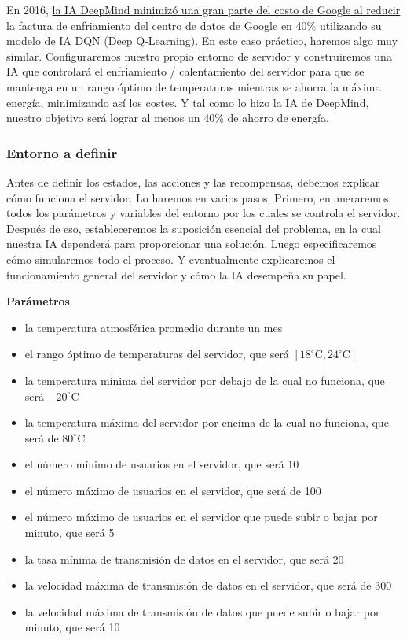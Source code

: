 \documentclass[
]{book}
\providecommand{\tightlist}{%
  \setlength{\itemsep}{0pt}\setlength{\parskip}{0pt}}
\begin{document}
En 2016, \href{https://deepmind.com/blog/deepmind-ai-reduces-google-data-centre-cooling-bill-40/}{la IA DeepMind minimizó una gran parte del costo de Google al reducir la factura de enfriamiento del centro de datos de Google en 40\%} utilizando su modelo de IA DQN (Deep Q-Learning). En este caso práctico, haremos algo muy similar. Configuraremos nuestro propio entorno de servidor y construiremos una IA que controlará el enfriamiento / calentamiento del servidor para que se mantenga en un rango óptimo de temperaturas mientras se ahorra la máxima energía, minimizando así los costes. Y tal como lo hizo la IA de DeepMind, nuestro objetivo será lograr al menos un 40\% de ahorro de energía.

\hypertarget{entorno-a-definir-1}{%
\subsubsection{Entorno a definir}\label{entorno-a-definir-1}}

Antes de definir los estados, las acciones y las recompensas, debemos explicar cómo funciona el servidor. Lo haremos en varios pasos. Primero, enumeraremos todos los parámetros y variables del entorno por los cuales se controla el servidor. Después de eso, estableceremos la suposición esencial del problema, en la cual nuestra IA dependerá para proporcionar una solución. Luego especificaremos cómo simularemos todo el proceso. Y eventualmente explicaremos el funcionamiento general del servidor y cómo la IA desempeña su papel.

\textbf{Parámetros}

\begin{itemize}
\tightlist
\item
  la temperatura atmosférica promedio durante un mes
\item
  el rango óptimo de temperaturas del servidor, que será \([18^{\circ} \textrm{C}, 24^{\circ} \textrm{C}]\)
\item
  la temperatura mínima del servidor por debajo de la cual no funciona, que será \(-20^{\circ} \textrm {C}\)
\item
  la temperatura máxima del servidor por encima de la cual no funciona, que será de \(80^{\circ} \textrm {C}\)
\item
  el número mínimo de usuarios en el servidor, que será 10
\item
  el número máximo de usuarios en el servidor, que será de 100
\item
  el número máximo de usuarios en el servidor que puede subir o bajar por minuto, que será 5
\item
  la tasa mínima de transmisión de datos en el servidor, que será 20
\item
  la velocidad máxima de transmisión de datos en el servidor, que será de 300
\item
  la velocidad máxima de transmisión de datos que puede subir o bajar por minuto, que será 10
\end{itemize}
\end{document}
